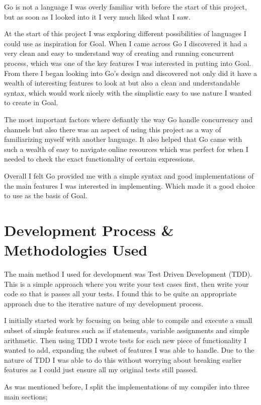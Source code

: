 Go is not a language I was overly familiar with before the start of this project, but as soon as I looked into it I very much liked what I saw. 

At the start of this project I was exploring different possibilities of languages I could use as inspiration for Goal. When I came across Go I discovered it had a very clean and easy to understand way of creating and running concurrent process, which was one of the key features I was interested in putting into Goal. From there I began looking into Go's design and discovered not only did it have a wealth of interesting features to look at but also a clean and understandable syntax, which would work nicely with the simplistic easy to use nature I wanted to create in Goal.

The most important factors where defiantly the way Go handle concurrency and channels but also there was an aspect of using this project as a way of familiarizing myself with another language. It also helped that Go came with such a wealth of easy to navigate online resources which was perfect for when I needed to check the exact functionality of certain expressions.

Overall I felt Go provided me with a simple syntax and good implementations of the main features I was interested in implementing. Which made it a good choice to use as the basis of Goal.

\section{Development Process \& Methodologies Used}

The main method I used for development was Test Driven Development (TDD). This is a simple approach where you write your test cases first, then write your code so that is passes all your tests. I found this to be quite an appropriate approach due to the iterative nature of my development process. 

I initially started work by focusing on being able to compile and execute a small subset of simple features such as if statements, variable assignments and simple arithmetic. Then using TDD I wrote tests for each new piece of functionality I wanted to add, expanding the subset of features I was able to handle. Due to the nature of TDD I was able to do this without worrying about breaking earlier features as I could just ensure all my original tests still passed.

As was mentioned before, I split the implementations of my compiler into three main sections;

